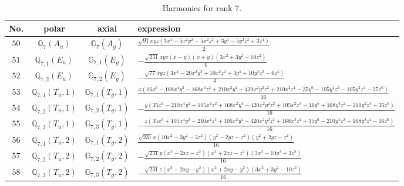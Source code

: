 \documentclass[fleqn,8pt,landscape]{jsarticle}
\begin{document}
\begin{table}[ht!]
\begin{center}
\caption{Harmonics for rank 7.}
\renewcommand{\arraystretch}{1.3}
\begin{tabular}{cccl} \hline \hline
No. & polar & axial & expression \\ \hline
$ 50 $ & $ \mathbb{Q}_{7}(A_{u}) $ & $ \mathbb{G}_{7}(A_{g}) $ & $ \frac{\sqrt{91} x y z \left(3 x^{4} - 5 x^{2} y^{2} - 5 x^{2} z^{2} + 3 y^{4} - 5 y^{2} z^{2} + 3 z^{4}\right)}{2} $ \\
$ 51 $ & $ \mathbb{Q}_{7,1}(E_{u}) $ & $ \mathbb{G}_{7,1}(E_{g}) $ & $ - \frac{\sqrt{231} x y z \left(x - y\right) \left(x + y\right) \left(3 x^{2} + 3 y^{2} - 10 z^{2}\right)}{4} $ \\
$ 52 $ & $ \mathbb{Q}_{7,2}(E_{u}) $ & $ \mathbb{G}_{7,2}(E_{g}) $ & $ - \frac{\sqrt{77} x y z \left(3 x^{4} - 20 x^{2} y^{2} + 10 x^{2} z^{2} + 3 y^{4} + 10 y^{2} z^{2} - 6 z^{4}\right)}{4} $ \\
$ 53 $ & $ \mathbb{Q}_{7,1}(T_{u},1) $ & $ \mathbb{G}_{7,1}(T_{g},1) $ & $ \frac{x \left(16 x^{6} - 168 x^{4} y^{2} - 168 x^{4} z^{2} + 210 x^{2} y^{4} + 420 x^{2} y^{2} z^{2} + 210 x^{2} z^{4} - 35 y^{6} - 105 y^{4} z^{2} - 105 y^{2} z^{4} - 35 z^{6}\right)}{16} $ \\
$ 54 $ & $ \mathbb{Q}_{7,2}(T_{u},1) $ & $ \mathbb{G}_{7,2}(T_{g},1) $ & $ - \frac{y \left(35 x^{6} - 210 x^{4} y^{2} + 105 x^{4} z^{2} + 168 x^{2} y^{4} - 420 x^{2} y^{2} z^{2} + 105 x^{2} z^{4} - 16 y^{6} + 168 y^{4} z^{2} - 210 y^{2} z^{4} + 35 z^{6}\right)}{16} $ \\
$ 55 $ & $ \mathbb{Q}_{7,3}(T_{u},1) $ & $ \mathbb{G}_{7,3}(T_{g},1) $ & $ - \frac{z \left(35 x^{6} + 105 x^{4} y^{2} - 210 x^{4} z^{2} + 105 x^{2} y^{4} - 420 x^{2} y^{2} z^{2} + 168 x^{2} z^{4} + 35 y^{6} - 210 y^{4} z^{2} + 168 y^{2} z^{4} - 16 z^{6}\right)}{16} $ \\
$ 56 $ & $ \mathbb{Q}_{7,1}(T_{u},2) $ & $ \mathbb{G}_{7,1}(T_{g},2) $ & $ \frac{\sqrt{231} x \left(10 x^{2} - 3 y^{2} - 3 z^{2}\right) \left(y^{2} - 2 y z - z^{2}\right) \left(y^{2} + 2 y z - z^{2}\right)}{16} $ \\
$ 57 $ & $ \mathbb{Q}_{7,2}(T_{u},2) $ & $ \mathbb{G}_{7,2}(T_{g},2) $ & $ - \frac{\sqrt{231} y \left(x^{2} - 2 x z - z^{2}\right) \left(x^{2} + 2 x z - z^{2}\right) \left(3 x^{2} - 10 y^{2} + 3 z^{2}\right)}{16} $ \\
$ 58 $ & $ \mathbb{Q}_{7,3}(T_{u},2) $ & $ \mathbb{G}_{7,3}(T_{g},2) $ & $ - \frac{\sqrt{231} z \left(x^{2} - 2 x y - y^{2}\right) \left(x^{2} + 2 x y - y^{2}\right) \left(3 x^{2} + 3 y^{2} - 10 z^{2}\right)}{16} $ \\

\end{tabular}
\end{center}
\end{table}
\end{document}
